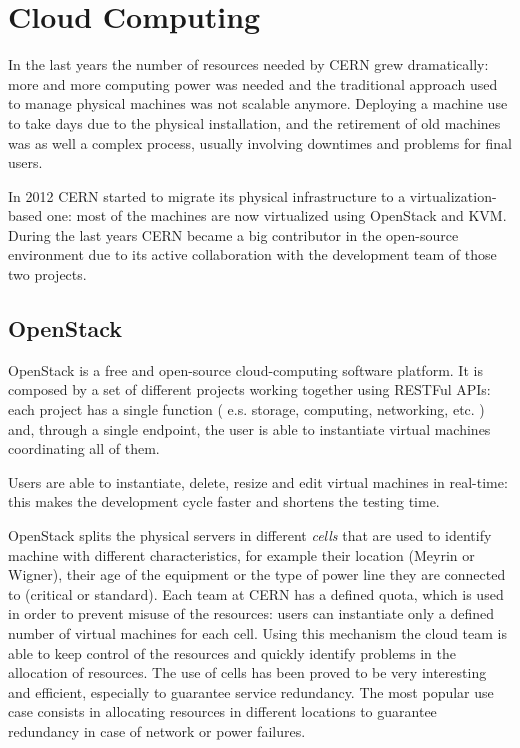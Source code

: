 \section{Cloud Computing}

In the last years the number of resources needed by CERN grew
dramatically: more and more computing power was needed and the traditional
approach used to manage physical machines was not scalable anymore.
Deploying a machine use to take days due to the physical installation, and
the retirement of old machines was as well a complex process, usually
involving downtimes and problems for final users.

In 2012 CERN started to migrate its physical infrastructure to
a virtualization-based one: most of the machines are now virtualized using
OpenStack and KVM. During the last years CERN became a big contributor in
the open-source environment due to its active collaboration with the
development team of those two projects.

\subsection{OpenStack}

OpenStack \cite{OpenStackWebsite} is a free and open-source
cloud-computing software platform. It is composed by a set of different
projects working together using RESTFul APIs: each project has a single
function ( e.s. storage, computing, networking, etc. ) and, through
a single endpoint, the user is able to instantiate virtual machines
coordinating all of them.

Users are able to instantiate, delete, resize and edit virtual machines in
real-time: this makes the development cycle faster and shortens the
testing time.

OpenStack splits the physical servers in different \textit{cells} that are
used to identify machine with different characteristics, for example their
location (Meyrin or Wigner), their age of the equipment or the type of
power line they are connected to (critical or standard). Each team at CERN
has a defined quota, which is used in order to prevent misuse of the
resources: users can instantiate only a defined number of virtual machines
for each cell. Using this mechanism the cloud team is able to keep control
of the resources and quickly identify problems in the allocation of
resources. The use of cells has been proved to be very interesting and
efficient, especially to guarantee service redundancy. The most popular
use case consists in allocating resources in different locations to
guarantee redundancy in case of network or power failures.

